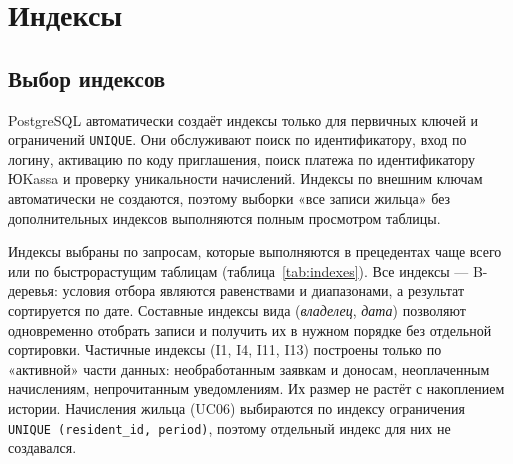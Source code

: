\documentclass[12pt,a4paper]{article}
\begin{document}
\section{Индексы}\label{sec:indexes}

\subsection{Выбор индексов}
PostgreSQL автоматически создаёт индексы только для первичных ключей и ограничений
\texttt{UNIQUE}. Они обслуживают поиск по идентификатору, вход по логину, активацию по коду
приглашения, поиск платежа по идентификатору ЮKassa и проверку уникальности начислений.
Индексы по внешним ключам автоматически не создаются, поэтому выборки «все записи жильца»
без дополнительных индексов выполняются полным просмотром таблицы.

Индексы выбраны по запросам, которые выполняются в прецедентах чаще всего или по
быстрорастущим таблицам (таблица~\ref{tab:indexes}). Все индексы --- B-деревья: условия отбора
являются равенствами и диапазонами, а результат сортируется по дате. Составные индексы
вида (\emph{владелец}, \emph{дата}) позволяют одновременно отобрать записи и получить их в нужном
порядке без отдельной сортировки. Частичные индексы (I1, I4, I11, I13) построены только по
«активной» части данных: необработанным заявкам и доносам, неоплаченным начислениям,
непрочитанным уведомлениям. Их размер не растёт с накоплением истории.
Начисления жильца (UC06) выбираются по индексу ограничения \texttt{UNIQUE (resident\_\allowbreak{}id, period)},
поэтому отдельный индекс для них не создавался.
\end{document}
